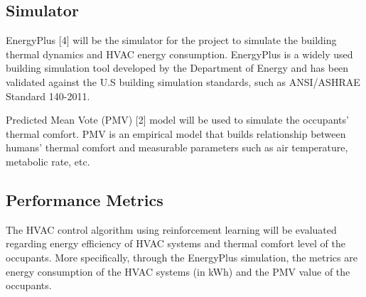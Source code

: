 \documentclass{article}
\begin{document}
\subsection{Simulator}
EnergyPlus [4] will be the simulator for the project to simulate the building thermal dynamics and HVAC energy consumption. EnergyPlus is a widely used building simulation tool developed by the Department of Energy and has been validated against the U.S building simulation standards, such as ANSI/ASHRAE Standard 140-2011. 

Predicted Mean Vote (PMV) [2] model will be used to simulate the occupants' thermal comfort. PMV is an empirical model that builds relationship between humans' thermal comfort and measurable parameters such as air temperature, metabolic rate, etc.  

\subsection{Performance Metrics}
The HVAC control algorithm using reinforcement learning will be evaluated regarding energy efficiency of HVAC systems and thermal comfort level of the occupants. More specifically, through the EnergyPlus simulation, the metrics are energy consumption of the HVAC systems (in kWh) and the PMV value of the occupants. 
\end{document}
